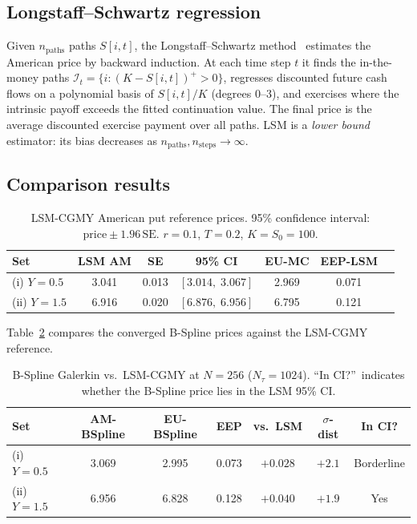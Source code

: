 \documentclass[11pt,a4paper]{article}
\begin{document}
\subsection{Longstaff--Schwartz regression}

Given $n_{\mathrm{paths}}$ paths $S[i,t]$, the Longstaff--Schwartz
method~\cite{LS2001} estimates the American price by backward induction.
At each time step $t$ it finds the in-the-money paths
$\mathcal{I}_t = \{i : (K-S[i,t])^+ > 0\}$, regresses discounted future cash
flows on a polynomial basis of $S[i,t]/K$ (degrees $0$--$3$), and exercises
where the intrinsic payoff exceeds the fitted continuation value.  The final
price is the average discounted exercise payment over all paths.  LSM is a
\emph{lower bound} estimator: its bias decreases as $n_{\mathrm{paths}},
n_{\mathrm{steps}} \to \infty$.

\subsection{Comparison results}

\begin{table}[ht]
\centering
\caption{LSM-CGMY American put reference prices.
  95\% confidence interval: $\mathrm{price} \pm 1.96\,\mathrm{SE}$.
  $r=0.1$, $T=0.2$, $K=S_0=100$.}
\label{tab:lsm}
\begin{tabular}{lcccccc}
\toprule
Set & LSM AM & SE & 95\% CI & EU-MC & EEP-LSM \\
\midrule
(i) $Y=0.5$  & 3.041 & 0.013 & $[3.014,\;3.067]$ & 2.969 & 0.071 \\
(ii) $Y=1.5$ & 6.916 & 0.020 & $[6.876,\;6.956]$ & 6.795 & 0.121 \\
\bottomrule
\end{tabular}
\end{table}

Table~\ref{tab:lsm_vs_bs} compares the converged B-Spline prices against the
LSM-CGMY reference.

\begin{table}[ht]
\centering
\caption{B-Spline Galerkin vs.\ LSM-CGMY at $N=256$ ($N_\tau=1024$).
  ``In CI?''\ indicates whether the B-Spline price lies in the LSM 95\% CI.}
\label{tab:lsm_vs_bs}
\begin{tabular}{lcccccc}
\toprule
Set & AM-BSpline & EU-BSpline & EEP & vs.\ LSM & $\sigma$-dist & In CI? \\
\midrule
(i) $Y=0.5$  & 3.069 & 2.995 & 0.073 & $+0.028$ & $+2.1$ & Borderline \\
(ii) $Y=1.5$ & 6.956 & 6.828 & 0.128 & $+0.040$ & $+1.9$ & Yes \\
\bottomrule
\end{tabular}
\end{table}
\end{document}
